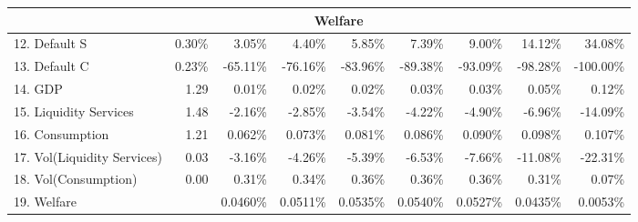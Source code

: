 \documentclass[letterpaper,12pt,dvipsnames,usenames]{article}
\theoremstyle{plain}
\begin{document}
{\begin{landscape}
\begin{table}
{\begin{tabular}{lr|rrrrrrr}
				& \multicolumn{6}{c}{\textbf{Welfare}}            \\  \midrule
				12. Default S & 0.30\% &  3.05\% & 4.40\% & 5.85\% & 7.39\% & 9.00\% & 14.12\%  & 34.08\%  \\
				13. Default C & 0.23\%  &  -65.11\% &  -76.16\% &-83.96\% & -89.38\% & -93.09\% & -98.28\% & -100.00\%  \\
				14. GDP & 1.29 & 0.01\% & 0.02\% & 0.02\% & 0.03\% & 0.03\% & 0.05\%  & 0.12\%   \\
				15. Liquidity Services & 1.48  & -2.16\% & -2.85\% & -3.54\% & -4.22\% & -4.90\% & -6.96\%  & -14.09\%  \\
				16. Consumption & 1.21  & 0.062\% & 0.073\% & 0.081\% & 0.086\% & 0.090\% & 0.098\% & 0.107\%  \\
				17. Vol(Liquidity Services) & 0.03  & -3.16\% & -4.26\% & -5.39\% & -6.53\% & -7.66\% & -11.08\%  & -22.31\%  \\
				18. Vol(Consumption) & 0.00 & 0.31\% &  0.34\% & 0.36\% &  0.36\% & 0.36\% & 0.31\%  & 0.07\%  \\
				19. Welfare &   & 0.0460\% & 0.0511\% & 0.0535\% & 0.0540\% & 0.0527\% & 0.0435\% & 0.0053\%  \\
				\bottomrule
			\end{tabular}%
		\label{tab:mainex}
		}
		\end{table}
	\end{landscape}
	\clearpage%
}


\clearpage 
\newpage
\end{document}
